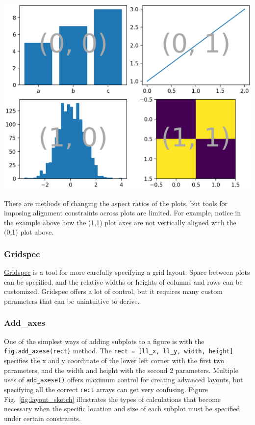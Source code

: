 \documentclass[11pt]{caltech_thesis} %
\begin{document}
\includegraphics{chapter_05/figs_05/sphx_glr_mosaic_001_2_0x.webp}

There are methods of changing the aspect ratios of the plots, but tools
for imposing alignment constraints across plots are limited. For
example, notice in the example above how the (1,1) plot axes are not
vertically aligned with the (0,1) plot above.

\hypertarget{gridspec}{%
\subsubsection{Gridspec}\label{gridspec}}

\href{https://matplotlib.org/stable/gallery/lines_bars_and_markers/scatter_hist.html\#sphx-glr-gallery-lines-bars-and-markers-scatter-hist-py}{Gridspec}
is a tool for more carefully specifying a grid layout. Space between
plots can be specified, and the relative widths or heights of columns
and rows can be customized. Gridspec offers a lot of control, but it
requires many custom parameters that can be unintuitive to derive.

\hypertarget{add_axes}{%
\subsubsection{Add\_axes}\label{add_axes}}

One of the simplest ways of adding subplots to a figure is with the
\texttt{fig.add\_axese(rect)} method. The
\texttt{rect\ =\ {[}ll\_x,\ ll\_y,\ width,\ height{]}} specifies the x
and y coordinate of the lower left corner with the first two parameters,
and the width and height with the second 2 parameters. Multiple uses of
\texttt{add\_axese()} offers maximum control for creating advanced
layouts, but specifying all the correct \texttt{rect} arrays can get
very confusing. Figure Fig.~\ref{fig:layout_sketch} illustrates the
types of calculations that become necessary when the specific location
and size of each subplot must be specified under certain constraints.
\end{document}
